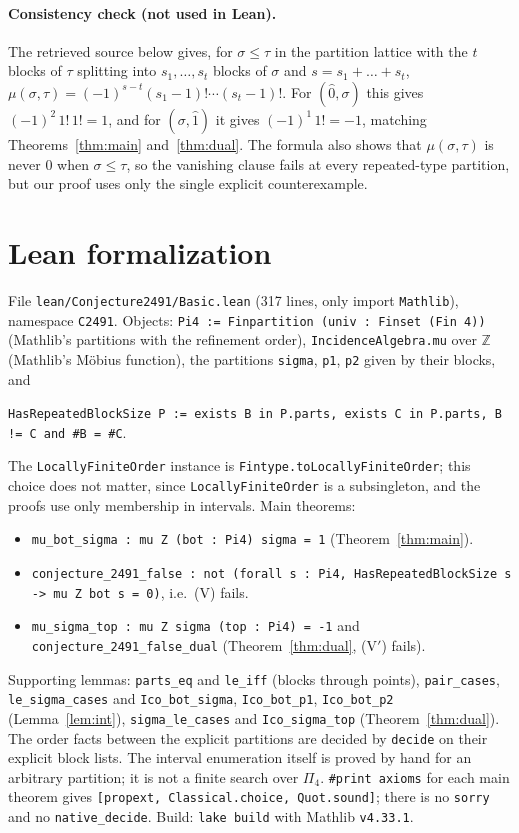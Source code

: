 \documentclass[11pt]{article}
\theoremstyle{definition}
\begin{document}
\paragraph{Consistency check (not used in Lean).} The retrieved source below gives, for
$\sigma\le\tau$ in the partition lattice with the $t$ blocks of $\tau$ splitting into
$s_1,\dots,s_t$ blocks of $\sigma$ and $s=s_1+\dots+s_t$,
$\mu(\sigma,\tau)=(-1)^{s-t}(s_1-1)!\cdots(s_t-1)!$. For $(\hat0,\sigma)$ this gives
$(-1)^{2}\,1!\,1!=1$, and for $(\sigma,\hat1)$ it gives $(-1)^{1}\,1!=-1$, matching
Theorems~\ref{thm:main} and~\ref{thm:dual}. The formula also shows that $\mu(\sigma,\tau)$ is
never $0$ when $\sigma\le\tau$, so the vanishing clause fails at every repeated-type partition, but
our proof uses only the single explicit counterexample.

\section{Lean formalization}
File \texttt{lean/Conjecture2491/Basic.lean} (317 lines, only import \texttt{Mathlib}), namespace
\texttt{C2491}. Objects: \texttt{Pi4 := Finpartition (univ : Finset (Fin 4))} (Mathlib's
partitions with the refinement order), \texttt{IncidenceAlgebra.mu} over $\mathbb Z$ (Mathlib's
M\"obius function), the partitions \texttt{sigma}, \texttt{p1}, \texttt{p2} given by their blocks,
and
\begin{center}
\texttt{HasRepeatedBlockSize P := exists B in P.parts, exists C in P.parts, B != C and \#B = \#C}.
\end{center}
The \texttt{LocallyFiniteOrder} instance is \texttt{Fintype.toLocallyFiniteOrder}; this choice
does not matter, since \texttt{LocallyFiniteOrder} is a subsingleton, and the proofs use only
membership in intervals. Main theorems:
\begin{itemize}
\item \texttt{mu\_bot\_sigma : mu Z (bot : Pi4) sigma = 1} (Theorem~\ref{thm:main}).
\item \texttt{conjecture\_2491\_false : not (forall s : Pi4, HasRepeatedBlockSize s -> mu Z bot s = 0)},
  i.e.\ (V) fails.
\item \texttt{mu\_sigma\_top : mu Z sigma (top : Pi4) = -1} and
  \texttt{conjecture\_2491\_false\_dual} (Theorem~\ref{thm:dual}, (V$'$) fails).
\end{itemize}
Supporting lemmas: \texttt{parts\_eq} and \texttt{le\_iff} (blocks through points),
\texttt{pair\_cases}, \texttt{le\_sigma\_cases} and \texttt{Ico\_bot\_sigma},
\texttt{Ico\_bot\_p1}, \texttt{Ico\_bot\_p2} (Lemma~\ref{lem:int}), \texttt{sigma\_le\_cases} and
\texttt{Ico\_sigma\_top} (Theorem~\ref{thm:dual}). The order facts between the explicit partitions
are decided by \texttt{decide} on their explicit block lists. The interval enumeration itself is
proved by hand for an arbitrary partition; it is not a finite search over $\Pi_4$.
\texttt{\#print axioms} for each main theorem gives \texttt{[propext, Classical.choice,
Quot.sound]}; there is no \texttt{sorry} and no \texttt{native\_decide}. Build: \texttt{lake build}
with Mathlib \texttt{v4.33.1}.
\end{document}
